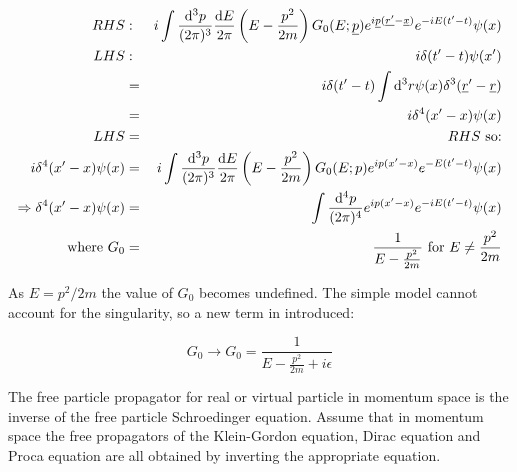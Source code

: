 \begin{eqnarray*}
  RHS & : & i\int\frac{\mathrm{d}^3p}{(2 \pi)^3}\frac{\mathrm{d}E}{2\pi}\left(E - \frac{p^2}{2m}\right)G_0(E;\underline{p}) e^{i\underline{p}(\underline{r'}-\underline{x})}e^{-iE(t'-t)}\psi(x) \\
  LHS & : & i\delta(t'-t)\psi(x') \\
      & = & i\delta(t'-t)\int\mathrm{d}^3r\psi(x)\delta^3(\underline{r}' - \underline{r}) \\
      & = & i\delta^4(x'-x)\psi(x) \\
  LHS & = & RHS \textrm{ so:} \\
  i\delta^4(x'-x)\psi(x) & = & i\int\frac{\mathrm{d}^3p}{(2\pi)^3}\frac{\mathrm{d}E}{2\pi}\left(E - \frac{p^2}{2m}\right)G_0(E;p)e^{ip(x'-x)}e^{-E(t'-t)}\psi(x) \\
  \Rightarrow \delta^4(x'-x)\psi(x) & = & \int\frac{\mathrm{d}^4p}{(2\pi)^4}e^{ip(x'-x)}e^{-iE(t'-t)}\psi(x) \\
  \textrm{where } G_0 & = & \frac{1}{E - \frac{p^2}{2m}} \textrm{ for } E \neq \frac{p^2}{2m}
\end{eqnarray*}

As $E = p^2/2m$ the value of $G_0$ becomes undefined.  The simple model cannot account for the singularity, so a new term in introduced:

\[
  G_0 \to G_0 = \frac{1}{E - \frac{p^2}{2m} + i\epsilon}
\]

The free particle propagator for  real or virtual particle in momentum space is the inverse of the free particle Schroedinger equation.  Assume that in momentum space the free propagators of the Klein-Gordon equation, Dirac equation and Proca equation are all obtained by inverting the appropriate equation.
